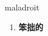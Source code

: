 
\begin{frame}
{\huge maladroit}
\begin{center}
\begin{enumerate}\Large
  \item \textbf{笨拙的}
\end{enumerate}
\end{center}
\end{frame}
